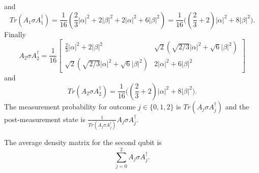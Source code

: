 \documentclass[letterpaper,12pt,oneside,onecolumn]{article}
\begin{document}
and
$$Tr(A_1\sigma A_1^\dagger) = \frac{1}{16}(\frac{2}{3}|\alpha|^2 + 2|\beta|^2 + 2|\alpha|^2 + 6|\beta|^2)=\frac{1}{16}\big( (\frac{2}{3} + 2)|\alpha|^2 + 8|\beta|^2 \big).$$
Finally
$$A_2 \sigma A_2^\dagger = \frac{1}{16}\begin{bmatrix}
\frac{2}{3}|\alpha|^2 + 2|\beta|^2 & \sqrt{2}(\sqrt{2/3}|\alpha|^2 + \sqrt{6}|\beta|^2) \\
 \sqrt{2}(\sqrt{2/3}|\alpha|^2 + \sqrt{6}|\beta|^2) & 2|\alpha|^2 + 6|\beta|^2
\end{bmatrix}$$
and
$$Tr(A_2 \sigma A_2^\dagger) =\frac{1}{16}\big( (\frac{2}{3} + 2)|\alpha|^2 + 8|\beta|^2 \big).$$
The measurement probability for outcome $j \in \{0,1,2\}$ is $Tr(A_j \sigma A_j^\dagger)$ and the post-measurement state is $\frac{1}{Tr(A_j \sigma A_j^\dagger)}A_j\sigma A_j^\dagger.$

The average density matrix for the second qubit is
$$\sum_{j=0}^2 A_j \sigma A_j^\dagger.$$
\end{document}
